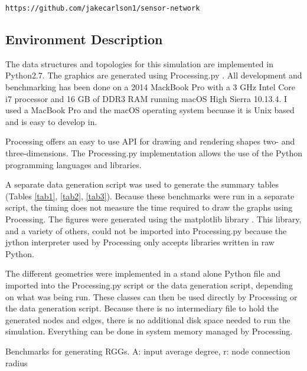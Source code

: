 \documentclass{article}
\begin{document}
    \begin{center}
        \texttt{https://github.com/jakecarlson1/sensor-network}
    \end{center}

    \subsection{Environment Description}
    The data structures and topologies for this simulation are implemented in Python2.7. The graphics are generated using Processing.py \cite{processing}. All development and benchmarking has been done on a 2014 MackBook Pro with a 3 GHz Intel Core i7 processor and 16 GB of DDR3 RAM running macOS High Sierra 10.13.4. I used a MacBook Pro and the macOS operating system becuase it is Unix based and is easy to develop in.
    \par
    Processing offers an easy to use API for drawing and rendering shapes two- and three-dimensions. The Processing.py implementation allows the use of the Python programming languages and libraries.
    \par
    A separate data generation script was used to generate the summary tables (Tables \ref{tab1}, \ref{tab2}, \ref{tab3}). Because these benchmarks were run in a separate script, the timing does not measure the time required to draw the graphs using Processing. The figures were generated using the matplotlib library \cite{matplotlib}. This library, and a variety of others, could not be imported into Processing.py because the jython interpreter used by Processing only accepts libraries written in raw Python.
    \par
    The different geometries were implemented in a stand alone Python file and imported into the Processing.py script or the data generation script, depending on what was being run. These classes can then be used directly by Processing or the data generation script. Because there is no intermediary file to hold the generated nodes and edges, there is no additional disk space needed to run the simulation. Everything can be done in system memory managed by Processing.

    \begin{center}
        \begin{table}[h]
            \centering
            \begin{adjustbox}{width=1\textwidth}
            \end{adjustbox}
            \caption{Benchmarks for generating RGGs. A: input average degree, r: node connection radius}
            \label{tab1}
        \end{table}
    \end{center}
\end{document}
